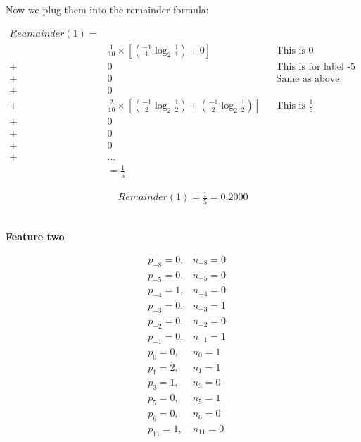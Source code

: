 \documentclass[12pt]{article}
\begin{document}
\noindent

Now we plug them into the remainder formula:

\begin{center}
    
    \begin{align*}
        Reamainder(1) =\\
        &\frac{1}{10} \times [(\frac{-1}{1}\log_{2}{\frac{1}{1}}) + 0] &&\text{This is 0}\\
        + &0 &&\text{This is for label -5 which is also 0.} \\
        + &0 &&\text{Same as above.}\\
        + &0\\
        + &\frac{2}{10} \times [(\frac{-1}{2}\log_{2}{\frac{1}{2}}) + (\frac{-1}{2}\log_{2}{\frac{1}{2}})] &&\text{This is } \frac{1}{5}\\
        + &0\\
        + &0\\
        + &0 \\
        + &\ldots\\
        &=  \frac{1}{5}
    \end{align*}
    
    \begin{align*}
        Remainder(1) = \frac{1}{5} = 0.2000
    \end{align*}
    \\[0.1 in]
\end{center}

\noindent
\textbf{Feature two}
\begin{center}
    
    
    \begin{align*}
        &p_{-8}=0, &n_{-8}=0\\
        &p_{-5}=0, &n_{-5}=0\\
        &p_{-4}=1, &n_{-4}=0\\
        &p_{-3}=0, &n_{-3}=1\\
        &p_{-2}=0, &n_{-2}=0\\
        &p_{-1}=0 ,&n_{-1}=1\\
        &p_{0}=0, &n_{0}=1\\
        &p_{1}=2, &n_{1}=1\\
        &p_{3}=1, &n_{3}=0\\
        &p_{5}=0, &n_{5}=1\\
        &p_{6}=0, &n_{6}=0\\
        &p_{11}=1, &n_{11}=0\\
    \end{align*}
    \\[0.1 in]
\end{center}
\end{document}
